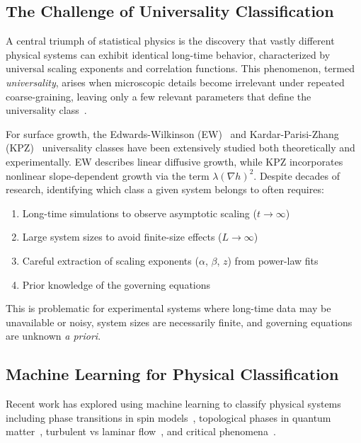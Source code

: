 \documentclass[aps,pre,twocolumn,superscriptaddress,showpacs]{revtex4-2}
\begin{document}
\subsection{The Challenge of Universality Classification}

A central triumph of statistical physics is the discovery that vastly different physical systems can exhibit identical long-time behavior, characterized by universal scaling exponents and correlation functions. This phenomenon, termed \emph{universality}, arises when microscopic details become irrelevant under repeated coarse-graining, leaving only a few relevant parameters that define the universality class~\cite{Kadanoff2000,Goldenfeld1992}.

For surface growth, the Edwards-Wilkinson (EW)~\cite{Edwards1982} and Kardar-Parisi-Zhang (KPZ)~\cite{Kardar1986} universality classes have been extensively studied both theoretically and experimentally. EW describes linear diffusive growth, while KPZ incorporates nonlinear slope-dependent growth via the term $\lambda(\nabla h)^2$. Despite decades of research, identifying which class a given system belongs to often requires:
\begin{enumerate}
\item Long-time simulations to observe asymptotic scaling ($t \to \infty$)
\item Large system sizes to avoid finite-size effects ($L \to \infty$)
\item Careful extraction of scaling exponents ($\alpha$, $\beta$, $z$) from power-law fits
\item Prior knowledge of the governing equations
\end{enumerate}

This is problematic for experimental systems where long-time data may be unavailable or noisy, system sizes are necessarily finite, and governing equations are unknown \emph{a priori}.

\subsection{Machine Learning for Physical Classification}

Recent work has explored using machine learning to classify physical systems including phase transitions in spin models~\cite{Carrasquilla2017,Wang2016}, topological phases in quantum matter~\cite{Zhang2017}, turbulent vs laminar flow~\cite{Ling2016}, and critical phenomena~\cite{Wetzel2017,Hu2017}.
\end{document}
